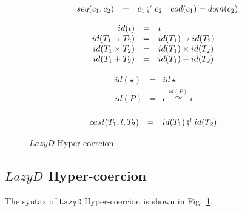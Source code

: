 \documentclass[acmsmall,review,anonymous]{acmart}\settopmatter{printfolios=true,printccs=false,printacmref=false}
\newcommand{\figref}[1]{Fig.~\ref{#1}}
\newcommand{\funrule}[3]{#1 &=& #2 & #3\\}
\newcommand{\plus}[0]{+}
\newcommand{\lazyD}{$\mathtt{Lazy D}$}
\newcommand{\hyperCoercionI}[0]{id\star}
\newcommand{\hyperCoercionC}[3]{#1 \overset{#2}{\curvearrowright} #3}
\newcommand{\POOunit}[0]{\iota}
\newcommand{\POOfun}[2]{#1 \shortrightarrow #2}
\newcommand{\POOprod}[2]{#1 \times #2}
\newcommand{\POOsum}[2]{#1 \plus #2}
\begin{document}
\begin{figure}
	\[
	\begin{array}{rclr}
	\funrule{seq(c_1,c_2)}{
		c_1 \fatsemi^\epsilon c_2
	}{cod(c_1) = dom(c_2)}
	\end{array}
	\]
	
	\[
	\begin{array}{rclr}
	\funrule{id(\POOunit)}{\POOunit}{}
	\funrule{id(\POOfun{T_1}{T_2})}{
		\POOfun{id(T_1)}{id(T_2)}
	}{}
	\funrule{id(\POOprod{T_1}{T_2})}{
		\POOprod{id(T_1)}{id(T_2)}
	}{}
	\funrule{id(\POOsum{T_1}{T_2})}{
		\POOsum{id(T_1)}{id(T_2)}
	}{}
	\end{array}
	\]
	
	\[
	\begin{array}{rclr}
	\funrule{id(\star)}{
		\hyperCoercionI
	}{}
	\funrule{id(P)}{
		\hyperCoercionC{\epsilon}{id(P)}{\epsilon}
	}{}
	\end{array}
	\]
	
	\[
	\begin{array}{rclr}
	\funrule{cast(T_1,l,T_2)}{
		id(T_1) \fatsemi^l id(T_2)
	}{}
	\end{array}
	\]
	

	\caption{$Lazy D$ Hyper-coercion}
	\label{fig:HC-D}
\end{figure}

\subsection{$Lazy D$ Hyper-coercion}

The syntax of \lazyD{} Hyper-coercion is shown in \figref{fig:HC-D}.
\end{document}
